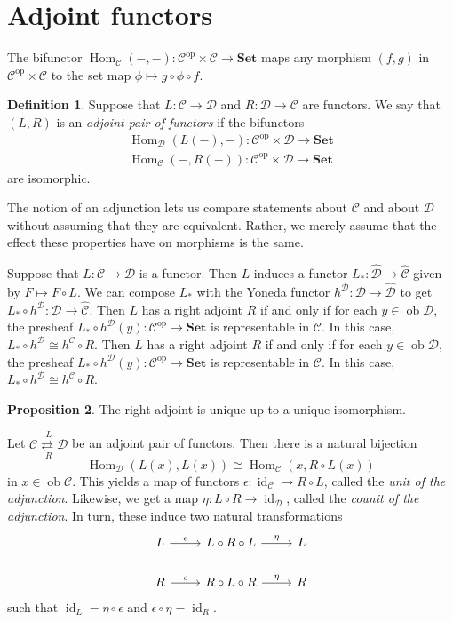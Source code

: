 \documentclass[10pt,letterpaper,cm]{nupset}
\theoremstyle{definition}
\newtheorem{definition}{Definition}[subsection]
\theoremstyle{theorem}
\newtheorem{prop}[definition]{Proposition}
\theoremstyle{remark}
\newcommand{\1}{\mathbf{1}}
\renewcommand{\c}{\mathscr{C}}
\renewcommand{\d}{\mathscr{D}}
\newcommand{\0}{\vec 0}
\DeclareMathOperator{\id}{\mathrm{id}}
\DeclareMathOperator{\op}{op}
\DeclareMathOperator{\ob}{ob}
\DeclareMathOperator{\Hom}{Hom}
\begin{document}
\section{Adjoint functors}

The bifunctor $\Hom_{\c}({-}, {-}) : \c^{\op} \times \c \to \mathbf{Set}$ maps any morphism $\left(f, g\right)$ in $\c^{\op} \times \c$ to the set map $\phi \mapsto g \circ \phi \circ f$.

\begin{definition}
Suppose that $L: \c \to \d$ and $R: \d \to \c$ are functors. We say that $\left(L, R\right)$ is an \textit{adjoint pair of functors} if the bifunctors
\begin{gather*}
\Hom_{\d}(L(-), -) : \c^{\op} \times \d \to \mathbf{Set}
\\  \Hom_{\c}(-, R(-)) : \c^{\op} \times \d \to \mathbf{Set} 
\end{gather*}
are isomorphic.
\end{definition}

 The notion of an adjunction lets us compare statements about  $\c$ and about $\d$ without assuming that they are equivalent. Rather,  we merely assume that the effect these properties have on morphisms is the same.

\medskip

Suppose that $L : \c \to \d$ is a functor. Then $L$ induces a functor $L_{\ast} : \widehat{\d} \to \widehat{\c}$ given by $F \mapsto F \circ L$. We can compose $L_{\ast}$ with the Yoneda functor $h^{\d} : \d \to \widehat{\d}$ to get $L_{\ast} \circ h^{\d} : \d \to \widehat{\c}$. Then $L$ has a right adjoint $R$  if and only if for each $y \in \ob \d$, the presheaf $L_{\ast} \circ h^{\d}(y) : \c^{\op} \to \mathbf{Set}$ is representable in $\c$. In this case, $L_{\ast} \circ h^{\d} \cong h^{\c} \circ R$. Then $L$ has a right adjoint $R$  if and only if for each $y \in \ob \d$, the presheaf $L_{\ast} \circ h^{\d}(y) : \c^{\op} \to \mathbf{Set}$ is representable in $\c$. In this case, $L_{\ast} \circ h^{\d} \cong h^{\c} \circ R$.

\begin{prop}
The right adjoint is unique up to a unique isomorphism.
\end{prop}

\medskip


 Let $\overset{L}{\underset{R}{\c \rightleftarrows \d}}$ be an adjoint pair of functors. Then there is a natural bijection $$\Hom_{\d}(L(x), L(x)) \cong \Hom_{\c}(x, R \circ L(x))$$ in $x\in \ob \c$. This yields a map of functors $\epsilon : \id_{\c} \to R \circ L$, called the \textit{unit of the adjunction}. Likewise, we get a map $\eta : L \circ R \to \id_{\d}$, called the \textit{counit of the adjunction}.
In turn, these induce two natural transformations 
\[
\begin{tikzcd}
L \arrow[r, "\epsilon"] & L \circ R \circ L \arrow[r, "\eta"] & L \\
R \arrow[r, "\epsilon"] & R\circ L \circ R \arrow[r, "\eta"] & R
\end{tikzcd}
\] such that $\id_L =\eta \circ \epsilon$ and $\epsilon \circ \eta = \id_R$. 
\end{document}
